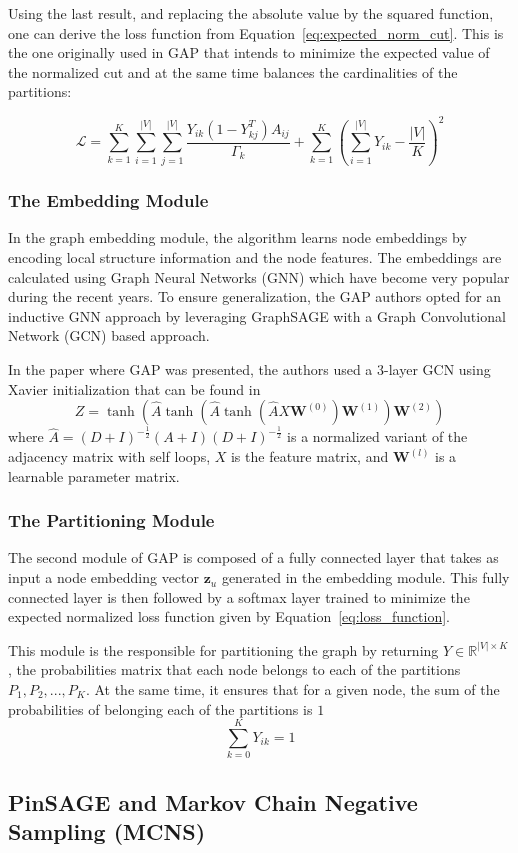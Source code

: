 Using the last result, and replacing the absolute value by the squared function, one can derive the loss function from Equation~\ref{eq:expected_norm_cut}. This is the one originally used in GAP that intends to minimize the expected value of the normalized cut and at the same time balances the cardinalities of the partitions:

\begin{equation}
    \label{eq:loss_function}
    \mathcal{L} = \sum_{k=1}^K\sum_{i=1}^{|V|}\sum_{j=1}^{|V|}\frac{Y_{ik}(1-Y_{kj}^T)A_{ij}}{\Gamma_k} + \sum_{k=1}^K\left(\sum_{i=1}^{|V|}Y_{ik} - \frac{|V|}{K}\right)^2
\end{equation}

\subsubsection{The Embedding Module} In the graph embedding module, the algorithm learns node embeddings by encoding local structure information and the node features. The embeddings are calculated using Graph Neural Networks (GNN) which have become very popular during the recent years. To ensure generalization, the GAP authors opted for an inductive GNN approach by leveraging GraphSAGE with a Graph Convolutional Network (GCN) based approach.

In the paper where GAP was presented, the authors used a $3$-layer GCN using Xavier initialization that can be found in~\cite{xavier}
\begin{displaymath}
    Z = \tanh(\hat{A}\tanh(\hat{A}\tanh(\hat{A}X\boldsymbol W^{(0)})\boldsymbol W^{(1)})\boldsymbol W^{(2)})
\end{displaymath}
where $\hat{A} = (D+I)^{-\frac{1}{2}}(A+I)(D+I)^{-\frac{1}{2}}$ is a normalized variant of the adjacency matrix with self loops, $X$ is the feature matrix, and $\boldsymbol W^{(l)}$ is a learnable parameter matrix.

\subsubsection{The Partitioning Module}
The second module of GAP is composed of a fully connected layer that takes as input a node embedding vector $\boldsymbol z_u$ generated in the embedding module. This fully connected layer is then followed by a softmax layer 
trained to minimize the expected normalized loss function given by Equation~\ref{eq:loss_function}.

This module is the responsible for partitioning the graph by returning $Y\in \mathbb R^{|V|\times K}$, the probabilities matrix that each node belongs to each of the partitions $P_1, P_2, ..., P_K$. At the same time, it ensures that for a given node, the sum of the probabilities of belonging each of the partitions is $1$
\begin{displaymath}
    \sum_{k=0}^K Y_{ik} = 1
\end{displaymath}



\subsection{PinSAGE and Markov Chain Negative Sampling (MCNS)}